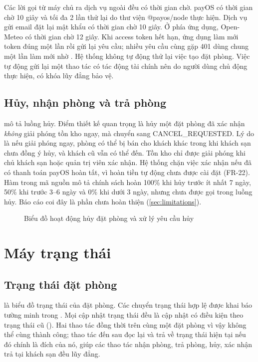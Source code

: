 Các lời gọi từ máy chủ ra dịch vụ ngoài đều có thời gian chờ. payOS có thời gian chờ 10 giây và tối đa 2 lần thử lại do thư viện @payos/node thực hiện. Dịch vụ gửi email đặt lại mật khẩu có thời gian chờ 10 giây. Ở phía ứng dụng, Open-Meteo có thời gian chờ 12 giây. Khi access token hết hạn, ứng dụng làm mới token đúng một lần rồi gửi lại yêu cầu; nhiều yêu cầu cùng gặp 401 dùng chung một lần làm mới nhờ . Hệ thống không tự động thử lại việc tạo đặt phòng. Việc tự động gửi lại một thao tác có tác động tài chính nên do người dùng chủ động thực hiện, có khóa lũy đẳng bảo vệ.

\subsection{Hủy, nhận phòng và trả phòng}

 mô tả luồng hủy. Điểm thiết kế quan trọng là hủy một đặt phòng đã xác nhận \emph{không} giải phóng tồn kho ngay, mà chuyển sang CANCEL\_REQUESTED. Lý do là nếu giải phóng ngay, phòng có thể bị bán cho khách khác trong khi khách sạn chưa đồng ý hủy, và khách cũ vẫn có thể đến. Tồn kho chỉ được giải phóng khi chủ khách sạn hoặc quản trị viên xác nhận. Hệ thống chặn việc xác nhận nếu đã có thanh toán payOS hoàn tất, vì hoàn tiền tự động chưa được cài đặt (FR-22). Hàm  trong mã nguồn mô tả chính sách hoàn 100\% khi hủy trước ít nhất 7 ngày, 50\% khi trước 3--6 ngày và 0\% khi dưới 3 ngày, nhưng chưa được gọi trong luồng hủy. Báo cáo coi đây là phần chưa hoàn thiện (\cref{sec:limitations}).

\begin{figure}[H]
\centering
{}
\caption{Biểu đồ hoạt động hủy đặt phòng và xử lý yêu cầu hủy}\label{fig:act-cancel}
\end{figure}

\section{Máy trạng thái}\label{sec:state-machine}

\subsection{Trạng thái đặt phòng}

 là biểu đồ trạng thái của đặt phòng. Các chuyển trạng thái hợp lệ được khai báo tường minh trong . Mọi cập nhật trạng thái đều là cập nhật có điều kiện theo trạng thái cũ (). Hai thao tác đồng thời trên cùng một đặt phòng vì vậy không thể cùng thành công; thao tác đến sau đọc lại và trả về trạng thái hiện tại nếu đó chính là đích của nó, giúp các thao tác nhận phòng, trả phòng, hủy, xác nhận trả tại khách sạn đều lũy đẳng.


